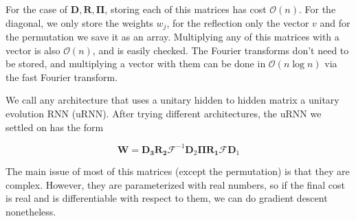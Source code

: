 \documentclass{article} %
\newcommand{\matr}[1]{\mathbf{#1}}
\begin{document}
For the case of $\matr{D}, \matr{R}, \matr{\Pi}$, storing each of this matrices has cost $\mathcal{O}(n)$. For the diagonal, we only store the weights $w_j$, for the reflection only the vector $v$ and for the permutation we save it as an array. Multiplying any of this matrices with a vector is also $\mathcal{O}(n)$, and is easily checked. The Fourier transforms don't need to be stored, and multiplying a vector with them can be done in $\mathcal{O}(n \log n)$ via the fast Fourier transform.

We call any architecture that uses a unitary hidden to hidden matrix a unitary evolution RNN (uRNN). After trying different architectures, the uRNN we settled on has the form

$$ \matr{W} = \matr{D_3} \matr{R_2} \mathcal{F}^{-1} \matr{D}_2 \matr{\Pi} \matr{R_1} \mathcal{F} \matr{D}_1 $$

The main issue of most of this matrices (except the permutation) is that they are complex. However, they are parameterized with real numbers, so if the final cost is real and is differentiable with respect to them, we can do gradient descent nonetheless.
\end{document}
